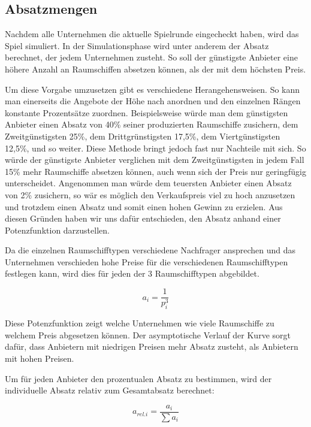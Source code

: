 \subsection{Absatzmengen}
\label{sub:spielwelt-logik-absatzmengen}

Nachdem alle Unternehmen die aktuelle Spielrunde eingecheckt haben, wird das Spiel simuliert. In der Simulationsphase
wird unter anderem der Absatz berechnet, der jedem Unternehmen zusteht. So soll der günstigste Anbieter eine höhere
Anzahl an Raumschiffen absetzen können, als der mit dem höchsten Preis.

Um diese Vorgabe umzusetzen gibt es verschiedene Herangehensweisen. So kann man einerseits die Angebote der Höhe nach
anordnen und den einzelnen Rängen konstante Prozentsätze zuordnen. Beispielsweise würde man dem günstigsten Anbieter
einen Absatz von 40\% seiner produzierten Raumschiffe zusichern, dem Zweitgünstigsten 25\%, dem Drittgrünstigsten 17,5\%,
dem Viertgünstigsten 12,5\%, und so weiter. Diese Methode bringt jedoch fast nur Nachteile mit sich. So würde der günstigste
Anbieter verglichen mit dem Zweitgünstigsten in jedem Fall 15\% mehr Raumschiffe absetzen können, auch wenn sich der Preis
nur geringfügig unterscheidet. Angenommen man würde dem teuersten Anbieter einen Absatz von 2\% zusichern, so wär es möglich
den Verkaufspreis viel zu hoch anzusetzen und trotzdem einen Absatz und somit einen hohen Gewinn zu erzielen. Aus diesen
Gründen haben wir uns dafür entschieden, den Absatz anhand einer Potenzfunktion darzustellen.

Da die einzelnen Raumschifftypen verschiedene Nachfrager ansprechen und das Unternehmen verschieden hohe Preise für die
verschiedenen Raumschifftypen festlegen kann, wird dies für jeden der 3 Raumschifftypen abgebildet.

\begin{equation}
     a_i = \frac{1}{p_i^3}
     \label{alg:spielwelt-logik-absatzmengen-1}
\end{equation}

Diese Potenzfunktion zeigt welche Unternehmen wie viele Raumschiffe zu welchem Preis abgesetzen können. Der asymptotische
Verlauf der Kurve sorgt dafür, dass Anbietern mit niedrigen Preisen mehr Absatz zusteht, als Anbietern mit hohen Preisen.

Um für jeden Anbieter den prozentualen Absatz zu bestimmen, wird der individuelle Absatz relativ zum Gesamtabsatz berechnet:

\begin{equation}
     a_{rel. i} = \frac{a_i}{\sum a_i}
     \label{alg:spielwelt-logik-absatzmengen-2}
\end{equation}

